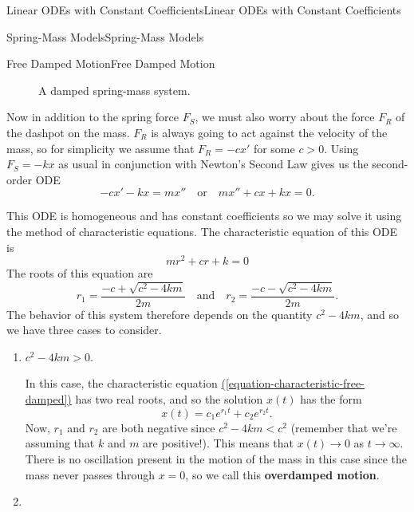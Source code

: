 \documentclass[10pt,]{book}
\newcommand{\terminology}[1]{\textbf{#1}}
\numberwithin{equation}{section}
\newcommand{\lt}{<}
\newcommand{\gt}{>}
\begin{document}
\begin{chapterptx}{Linear ODEs with Constant Coefficients}{}{Linear ODEs with Constant Coefficients}{}{}
\begin{sectionptx}{Spring-Mass Models}{}{Spring-Mass Models}{}{}
\begin{subsectionptx}{Free Damped Motion}{}{Free Damped Motion}{}{}
\begin{figure}
{\begin{tikzpicture}
\end{tikzpicture}
}
\caption{A damped spring-mass system.\label{figure-damped-spring}}
\end{figure}
\hypertarget{p-210}{}%
Now in addition to the spring force \(F_{S}\), we must also worry about the force \(F_{R}\) of the dashpot on the mass. \(F_{R}\) is always going to act against the velocity of the mass, so for simplicity we assume that \(F_{R} = -cx'\) for some \(c > 0\). Using \(F_{S} = -kx\) as usual in conjunction with Newton's Second Law gives us the second-order ODE%
\begin{equation*}
-cx'-kx = mx''\quad\text{or}\quad mx'' + cx + kx = 0.
\end{equation*}
%
\par
\hypertarget{p-211}{}%
This ODE is homogeneous and has constant coefficients so we may solve it using the method of characteristic equations. The characteristic equation of this ODE is%
\begin{equation}
mr^{2} + cr + k = 0\label{equation-characteristic-free-damped}
\end{equation}
The roots of this equation are%
\begin{equation}
r_{1} = \frac{-c + \sqrt{c^{2} - 4km}}{2m}\quad\text{and}\quad r_{2} = \frac{-c - \sqrt{c^{2} - 4km}}{2m}.\label{equation-characteristic-free-damped-roots}
\end{equation}
The behavior of this system therefore depends on the quantity \(c^{2} - 4km\), and so we have three cases to consider.%
\leavevmode%
\begin{enumerate}[label=\arabic*:]
\item\hypertarget{li-17}{}\hypertarget{p-212}{}%
\(c^{2} - 4km \gt 0\).%
\par
\hypertarget{p-213}{}%
In this case, the characteristic equation \hyperref[equation-characteristic-free-damped]{(\ref{equation-characteristic-free-damped})} has two real roots, and so the solution \(x(t)\) has the form%
\begin{equation*}
x(t) = c_{1}e^{r_{1}t} + c_{2}e^{r_{2}t}.
\end{equation*}
Now, \(r_{1}\) and \(r_{2}\) are both negative since \(c^{2} - 4km \lt c^{2}\) (remember that we're assuming that \(k\) and \(m\) are positive!). This means that \(x(t)\to0\) as \(t\to\infty\). There is no oscillation present in the motion of the mass in this case since the mass never passes through \(x = 0\), so we call this \terminology{overdamped motion}.%
\item\hypertarget{li-18}{}\hypertarget{p-214}{}%

\end{enumerate}
\end{subsectionptx}
\end{sectionptx}
\end{chapterptx}
\end{document}
